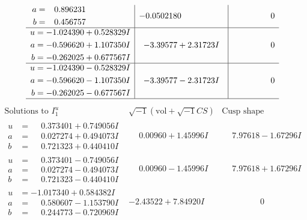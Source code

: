 \documentclass[1p]{elsarticle_modified}
\theoremstyle{definition}
\newcommand{\I}{\sqrt{-1}}
\begin{document}
$$\begin{array}{c|c|c}
\begin{aligned}
a &= \phantom{-}0.896231\phantom{ +0.000000I} \\
b &= \phantom{-}0.456757\phantom{ +0.000000I}\end{aligned}
 & -0.0502180\phantom{ +0.000000I} & \phantom{-0.000000 } 0 \\ \hline\begin{aligned}
u &= -1.024390 + 0.528329 I \\
a &= -0.596620 + 1.107350 I \\
b &= -0.262025 + 0.677567 I\end{aligned}
 & -3.39577 + 2.31723 I & \phantom{-0.000000 } 0 \\ \hline\begin{aligned}
u &= -1.024390 - 0.528329 I \\
a &= -0.596620 - 1.107350 I \\
b &= -0.262025 - 0.677567 I\end{aligned}
 & -3.39577 - 2.31723 I & \phantom{-0.000000 } 0\\
 \hline 
 \end{array}$$\newpage$$\begin{array}{c|c|c}  
\text{Solutions to }I^u_{1}& \I (\text{vol} + \sqrt{-1}CS) & \text{Cusp shape}\\
 \hline 
\begin{aligned}
u &= \phantom{-}0.373401 + 0.749056 I \\
a &= \phantom{-}0.027274 + 0.494073 I \\
b &= \phantom{-}0.721323 + 0.440410 I\end{aligned}
 & \phantom{-}0.00960 + 1.45996 I & \phantom{-}7.97618 - 1.67296 I \\ \hline\begin{aligned}
u &= \phantom{-}0.373401 - 0.749056 I \\
a &= \phantom{-}0.027274 - 0.494073 I \\
b &= \phantom{-}0.721323 - 0.440410 I\end{aligned}
 & \phantom{-}0.00960 - 1.45996 I & \phantom{-}7.97618 + 1.67296 I \\ \hline\begin{aligned}
u &= -1.017340 + 0.584382 I \\
a &= \phantom{-}0.580607 - 1.153790 I \\
b &= \phantom{-}0.244773 - 0.720969 I\end{aligned}
 & -2.43522 + 7.84920 I & \phantom{-0.000000 } 0 \\ \hline\begin{aligned}

\end{aligned}
\end{array}$$
\end{document}
